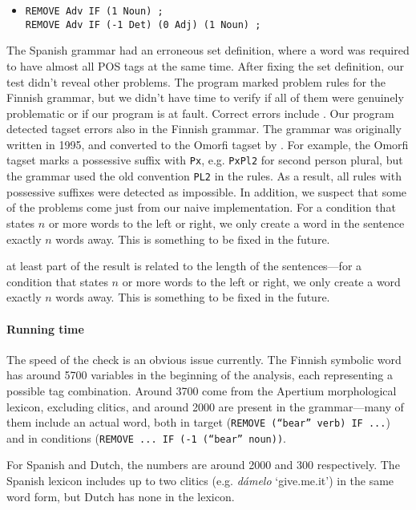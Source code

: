 \begin{itemize}
\item[] 
\begin{verbatim}REMOVE Adv IF (1 Noun) ;
REMOVE Adv IF (-1 Det) (0 Adj) (1 Noun) ;
\end{verbatim}
\end{itemize}

The Spanish grammar had an erroneous set definition, where a word was required to have almost all POS tags at the same time. After fixing the set definition, our test didn't reveal other problems.
The program marked  problem rules for the Finnish grammar, but we didn't have time to verify if all of them were genuinely problematic or if our program is at fault.
Correct errors include .
Our program detected tagset errors also in the Finnish grammar.
The grammar was originally written in 1995, and converted to the Omorfi tagset by \cite{pirinen2015}. 
For example, the Omorfi tagset marks a possessive suffix with \texttt{Px}, e.g. \texttt{PxPl2} for second person plural, but the grammar used the old convention \texttt{PL2} in the rules.
As a result, all rules with possessive suffixes were detected as impossible.
In addition, we suspect that some of the problems come just from our naive implementation.
For a condition that states $n$ or more words to the left or right, we only create a word in the sentence exactly $n$ words away. This is something to be fixed in the future.

 at least part of the result is related to the length of the sentences---for a condition that states $n$ or more words to the left or right, we only create a word exactly $n$ words away. This is something to be fixed in the future.

\paragraph{Running time} The speed of the check is an obvious issue currently.
The Finnish symbolic word has around 5700 variables in the beginning of the analysis, each representing a possible tag combination.
Around 3700 come from the Apertium morphological lexicon, excluding clitics, and around 2000 are present in the grammar---many of them include an actual word, both in target (\texttt{REMOVE (``bear'' verb) IF ...}) and in conditions (\texttt{REMOVE ... IF (-1 (``bear'' noun))}.

For Spanish and Dutch, the numbers are around 2000 and 300 respectively.
The Spanish lexicon includes up to two clitics (e.g. \emph{dámelo} `give.me.it') in the same word form, but Dutch has none in the lexicon.

